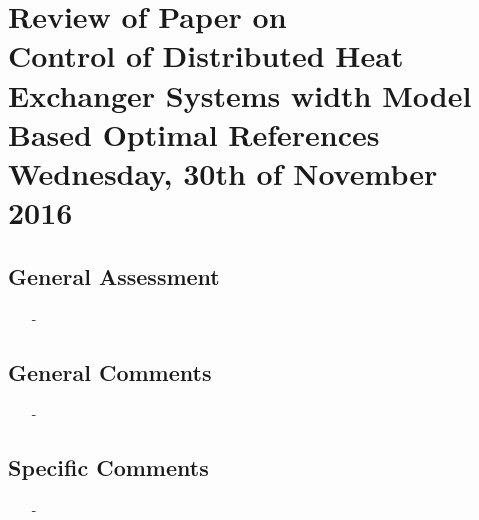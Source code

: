 
\renewcommand{\vec}[1]{\boldsymbol{\mathbf{#1}}}

\renewcommand\chaptername{KAPITEL}
\renewcommand\contentsname{Indhold}
\renewcommand\figurename{Figur}
\renewcommand\tablename{Tabel}

\section*{Review of Paper on\\
Control of Distributed Heat Exchanger Systems width
Model Based Optimal References\\
\small Wednesday, 30th of November 2016}
\subsection{General Assessment}
\begin{itemize}
	\item[-]
\end{itemize}
\subsection{General Comments}
\begin{itemize}
	\item[-] 
\end{itemize}	
\subsection{Specific Comments}
\begin{itemize}
	\item[-]
\end{itemize}

